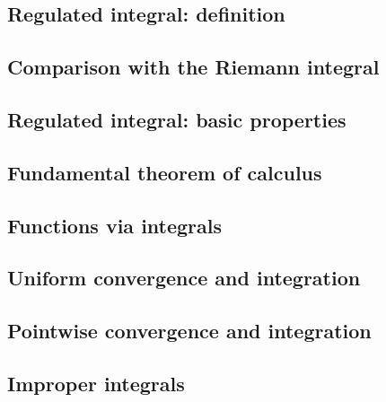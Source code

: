 \documentclass[10pt, a4paper]{article}
\begin{document}
\subsection{Regulated integral: definition}

\subsection{Comparison with the Riemann integral}

\subsection{Regulated integral: basic properties}

\subsection{Fundamental theorem of calculus}

\subsection{Functions via integrals}

\subsection{Uniform convergence and integration}

\subsection{Pointwise convergence and integration}

\subsection{Improper integrals}
\end{document}
